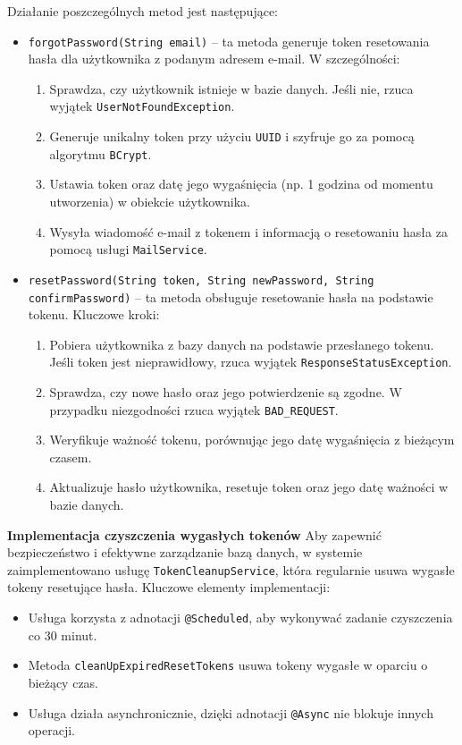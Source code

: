\noindent Działanie poszczególnych metod jest następujące:
\begin{itemize}
\item 
\texttt{forgotPassword(String email)} -- ta metoda generuje token resetowania hasła dla użytkownika z podanym adresem e-mail. W szczególności:
    \begin{enumerate}
        \item Sprawdza, czy użytkownik istnieje w bazie danych. Jeśli nie, rzuca wyjątek \texttt{UserNotFoundException}.
        \item Generuje unikalny token przy użyciu \texttt{UUID} i szyfruje go za pomocą algorytmu \texttt{BCrypt}.
        \item Ustawia token oraz datę jego wygaśnięcia (np. 1 godzina od momentu utworzenia) w obiekcie użytkownika.
        \item Wysyła wiadomość e-mail z tokenem i informacją o resetowaniu hasła za pomocą usługi \texttt{MailService}.
    \end{enumerate}
\item 
\texttt{resetPassword(String token, String newPassword, String confirmPassword)} -- ta metoda obsługuje resetowanie hasła na podstawie tokenu. Kluczowe kroki:
    \begin{enumerate}
        \item Pobiera użytkownika z bazy danych na podstawie przesłanego tokenu. Jeśli token jest nieprawidłowy, rzuca wyjątek \texttt{ResponseStatusException}.
        \item Sprawdza, czy nowe hasło oraz jego potwierdzenie są zgodne. W przypadku niezgodności rzuca wyjątek \texttt{BAD\_REQUEST}.
        \item Weryfikuje ważność tokenu, porównując jego datę wygaśnięcia z bieżącym czasem.
        \item Aktualizuje hasło użytkownika, resetuje token oraz jego datę ważności w bazie danych.
    \end{enumerate}
\end{itemize}

\noindent \textbf{Implementacja czyszczenia wygasłych tokenów}\newline
Aby zapewnić bezpieczeństwo i efektywne zarządzanie bazą danych, w systemie zaimplementowano usługę \texttt{TokenCleanupService}, która regularnie usuwa wygasłe tokeny resetujące hasła. Kluczowe elementy implementacji:
\begin{itemize}
    \item Usługa korzysta z adnotacji \texttt{@Scheduled}, aby wykonywać zadanie czyszczenia co 30 minut.
    \item Metoda \texttt{cleanUpExpiredResetTokens} usuwa tokeny wygasłe w oparciu o bieżący czas.
    \item Usługa działa asynchronicznie, dzięki adnotacji \texttt{@Async} nie blokuje innych operacji.
\end{itemize}

